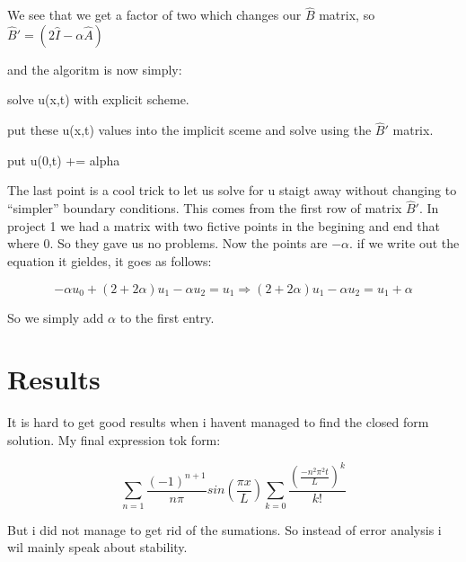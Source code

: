 \documentclass[norsk,a4paper,12pt]{article}
\begin{document}
We see that we get a factor of two which changes our $\hat B$ matrix, so $ \hat B' = (2 \hat I -\alpha \hat A)$

and the algoritm is now simply:

solve u(x,t) with explicit scheme.

put these u(x,t) values into the implicit sceme and solve using the $\hat B'$ matrix.

put u(0,t) += alpha

The last point is a cool trick to let us solve for u staigt away without changing to ``simpler'' boundary conditions.
This comes from the first row of matrix $\hat B'$. In project 1 we had a matrix with two fictive points in the begining and end
that where 0. So they gave us no problems. Now the points are $-\alpha$. if we write out the equation it gieldes, it goes as follows:


\begin{equation}
 -\alpha u_0 + (2+2\alpha) u_1 - \alpha u_2 = u_1 \Rightarrow (2+2\alpha) u_1 - \alpha u_2 = u_1 + \alpha
\end{equation}

So we simply add $\alpha$ to the first entry.

\section*{Results}

It is hard to get good results when i havent managed to find the closed form solution. My final expression tok form:

\begin{equation}
 \sum_{n=1}  \frac{(-1)^{n+1}}{n \pi} sin(\frac{\pi x}{L}) \sum_{k=0} \frac{(\frac{-n^2 \pi^2 t}{L})^k}{k!}
\end{equation}

But i did not manage to get rid of the sumations. So instead of error analysis i wil mainly speak about stability.
\end{document}
